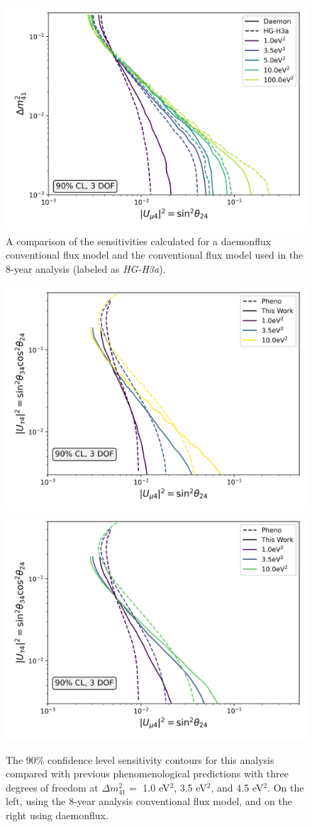 \documentclass[main.tex]{subfiles}
\begin{document}
\begin{figure}
    \centering
    \includegraphics[width=0.7\linewidth]{figures/double_joint_full_daemon_Realization_daemon_Asimov_sterile_0_cl0.9_dof3.png}
    \caption{A comparison of the sensitivities calculated for a daemonflux conventional flux model and the conventional flux model used in the 8-year analysis (labeled as \textit{HG-H3a}).}\label{fig:asimov_model_compare}
\end{figure}


\begin{figure}
    \centering
    \includegraphics[width=0.45\linewidth]{figures/pheno_joint_asimov_oldairs_Realization_Asimov_sterile_0_cl0.9_dof3.png}%
    \includegraphics[width=0.45\linewidth]{figures/pheno_joint_daemon_update_Realization_daemon_Asimov_sterile_0_cl0.9_dof3.png}
    \caption{The 90\% confidence level sensitivity contours for this analysis compared with previous phenomenological predictions with three degrees of freedom at $\Delta m_{41}^{2}=$ 1.0 eV$^{2}$, 3.5 eV$^{2}$, and  4.5 eV$^{2}$. On the left, using the 8-year analysis conventional flux model, and on the right using daemonflux.}\label{fig:pheno_compare}
\end{figure}
\end{document}
